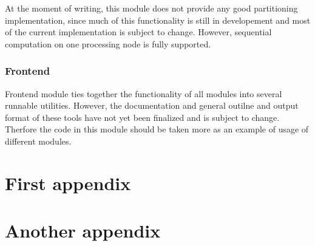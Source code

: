\documentclass[12pt,oneside,draft]{fithesis2}
\begin{document}
				At the moment of writing, this module does not provide any good partitioning implementation, since much of this functionality is still in developement and most of the current implementation is subject to change. However, sequential computation on one processing node is fully supported.
				
			\subsection{Frontend}			
			
				Frontend module ties together the functionality of all modules into several runnable utilities. However, the documentation and general outilne and output format of these tools have not yet been finalized and is subject to change. Therfore the code in this module should be taken more as an example of usage of different modules.		
		
					
    \appendix
    \chapter{First appendix}        %
    \Blindtext
    \chapter{Another appendix}
    \Blindtext

      
	
\end{document}
